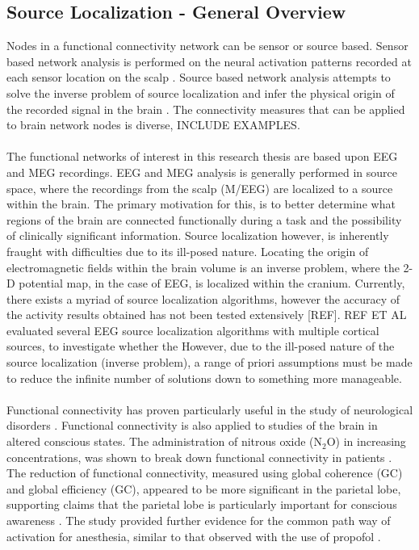 \documentclass[11pt]{article}
\begin{document}
\subsection{Source Localization - General Overview}
Nodes in a functional connectivity network can be sensor or source based. Sensor based network analysis is performed on the neural activation patterns recorded at each sensor location on the scalp \citep{fornito2013graph}. Source based network analysis attempts to solve the inverse problem of source localization and infer the physical origin of the recorded signal in the brain \citep{revbull}. The connectivity measures that can be applied to brain network nodes is diverse, INCLUDE EXAMPLES\citet{fornito2013graph}.\\
\\
The functional networks of interest in this research thesis are based upon EEG and MEG recordings. EEG and MEG analysis is generally performed in source space, where the recordings from the scalp (M/EEG) are localized to a source within the brain. The primary motivation for this, is to better determine what regions of the brain are connected functionally during a task and the possibility of clinically significant information. Source localization however, is inherently fraught with difficulties due to its ill-posed nature. Locating the origin of electromagnetic fields within the brain volume is an inverse problem, where the 2-D potential map, in the case of EEG, is localized within the cranium. Currently, there exists a myriad of source localization algorithms, however the accuracy of the activity results obtained has not been tested extensively [REF].  REF ET AL evaluated several EEG source localization algorithms with multiple cortical sources, to investigate whether the  However, due to the ill-posed nature of the source localization (inverse problem), a range of priori assumptions must be made to reduce the infinite number of solutions down to something more manageable.\\
\\
Functional connectivity has proven particularly useful in the study of neurological disorders \citet{friston}. Functional connectivity is also applied to studies of the brain in altered conscious states. The administration of nitrous oxide (N$_2$O) in increasing concentrations, was shown to break down functional connectivity in patients \citet{REF}. The reduction of functional connectivity, measured using global coherence (GC) and global efficiency (GC), appeared to be more significant in the parietal lobe, supporting claims that the parietal lobe is particularly important for conscious awareness \citet{friston}. The study provided further evidence for the common path way of activation for anesthesia, similar to that observed with the use of propofol \citet{friston}.  
\end{document}
